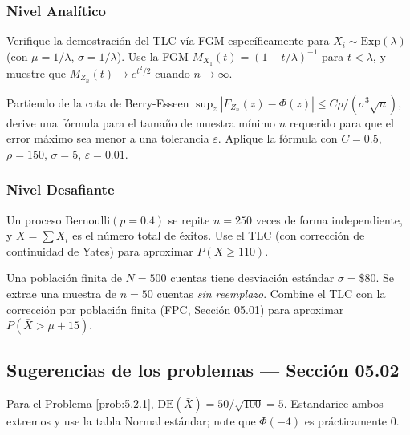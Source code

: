 \subsubsection*{Nivel Analítico}

\begin{problema}
	\label{prob:5.2.7}
	Verifique la demostración del TLC vía FGM específicamente para $X_i \sim \text{Exp}(\lambda)$ (con $\mu=1/\lambda$, $\sigma=1/\lambda$). Use la FGM $M_{X_1}(t) = (1-t/\lambda)^{-1}$ para $t<\lambda$, y muestre que $M_{Z_n}(t) \to e^{t^2/2}$ cuando $n\to\infty$.
\end{problema}

\begin{problema}
	\label{prob:5.2.8}
	Partiendo de la cota de Berry-Esseen $\sup_z|F_{Z_n}(z)-\Phi(z)| \le C\rho/(\sigma^3\sqrt{n})$, derive una fórmula para el tamaño de muestra mínimo $n$ requerido para que el error máximo sea menor a una tolerancia $\varepsilon$. Aplique la fórmula con $C=0.5$, $\rho=150$, $\sigma=5$, $\varepsilon=0.01$.
\end{problema}

\subsubsection*{Nivel Desafiante}

\begin{problema}
	\label{prob:5.2.9}
	Un proceso Bernoulli$(p=0.4)$ se repite $n=250$ veces de forma independiente, y $X=\sum X_i$ es el número total de éxitos. Use el TLC (con corrección de continuidad de Yates) para aproximar $P(X \ge 110)$.
\end{problema}

\begin{problema}
	\label{prob:5.2.10}
	Una población finita de $N=500$ cuentas tiene desviación estándar $\sigma=\$80$. Se extrae una muestra de $n=50$ cuentas \emph{sin reemplazo}. Combine el TLC con la corrección por población finita (FPC, Sección 05.01) para aproximar $P(\bar{X} > \mu + 15)$.
\end{problema}

\subsection*{Sugerencias de los problemas --- Sección 05.02}

\begin{sugerencia}
	\label{sug:5.2.1}
	Para el Problema \ref{prob:5.2.1}, $\text{DE}(\bar X)=50/\sqrt{100}=5$. Estandarice ambos extremos y use la tabla Normal estándar; note que $\Phi(-4)$ es prácticamente $0$.
\end{sugerencia}

